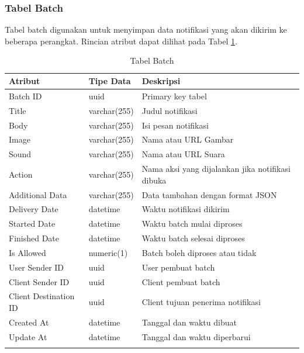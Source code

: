 \subsubsection{Tabel Batch}
\par Tabel batch digunakan untuk menyimpan data notifikasi yang akan dikirim ke beberapa perangkat. Rincian atribut dapat dilihat pada Tabel \ref{tabel_batch}.
\begin{longtable}{|p{2cm}|p{2.5cm}|p{4.5cm}|}
    \hline
    \textbf{Atribut} & \textbf{Tipe Data} & \textbf{Deskripsi} \\ \hline
    Batch ID & uuid & Primary key tabel \\ \hline
    Title & varchar(255) & Judul notifikasi \\ \hline
    Body & varchar(255) & Isi pesan notifikasi \\ \hline
    Image & varchar(255) & Nama atau URL Gambar \\ \hline
    Sound & varchar(255) & Nama atau URL Suara \\ \hline
    Action & varchar(255) & Nama aksi yang dijalankan jika notifikasi dibuka \\ \hline
    Additional Data & varchar(255) & Data tambahan dengan format JSON \\ \hline
    Delivery Date & datetime & Waktu notifikasi dikirim \\ \hline
    Started Date & datetime & Waktu batch mulai diproses \\ \hline
    Finished Date & datetime & Waktu batch selesai diproses \\ \hline
    Is Allowed & numeric(1) & Batch boleh diproses atau tidak \\ \hline
    User Sender ID & uuid & User pembuat batch \\ \hline
    Client Sender ID & uuid & Client pembuat batch \\ \hline
    Client Destination ID & uuid & Client tujuan penerima notifikasi \\ \hline
    Created At & datetime & Tanggal dan waktu dibuat \\ \hline
    Update At & datetime & Tanggal dan waktu diperbarui \\ \hline
    \caption{Tabel Batch}
    \label{tabel_batch}
\end{longtable}

